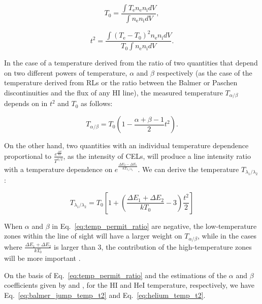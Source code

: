 \documentclass[fleqn,usenatbib]{mnras}
\begin{document}
\begin{equation}
    \label{eq:T0_def}
    T_{\mathrm 0}=\frac{\int T_{\mathrm e} n_{\mathrm e} n_{\mathrm i} dV}{\int n_{\mathrm e} n_{\mathrm i} dV},
\end{equation}

\begin{equation}
    \label{eq:t2_def}
    t^2=\frac{\int\left(T_{\mathrm e}-T_{\mathrm 0} \right)^2 n_{\mathrm e} n_{\mathrm i} dV}{T_{\mathrm 0} \int n_{\mathrm e} n_{\mathrm i} dV}.
\end{equation}

In the case of a temperature derived from the ratio of two quantities that depend on two different powers of temperature, $\alpha$ and $\beta$ respectively (as the case of the temperature derived from RLs or the ratio between the Balmer or Paschen discontinuities and the flux of any \mbox{H}\thinspace \mbox{I} line), the measured temperature $T_{\alpha/\beta}$ depends on in $t^2$ and $T_0$ as follows:  

\begin{equation}
    \label{eq:temp_permit_ratio}
    T_{\alpha/\beta}=T_0\left(1-\frac{\alpha+\beta-1}{2} t^2\right).
\end{equation}{}

On the other hand, two quantities with an individual temperature dependence proportional to $\frac{e^{\frac{\Delta E}{kT}}}{T^{1/2}}$, as the intensity of CELs, will produce a line intensity ratio with a temperature dependence on $e^{\frac{\Delta E_2-\Delta E_1}{k T_{\lambda_1/\lambda_2}}}$. We can derive the temperature $T_{\lambda_1/\lambda_2}$: 

\begin{equation}
    \label{eq:temp_forbidden_ratio}
    T_{\lambda_1/\lambda_2}=T_0 \left[1+\left(\frac{\Delta E_1 +\Delta E_2}{k T_0}-3\right)\frac{t^2}{2} \right]
\end{equation}{}

When $\alpha$ and $\beta$ in Eq.~\eqref{eq:temp_permit_ratio} are negative, the low-temperature zones within the line of sight will have a larger weight on $T_{\alpha/\beta}$, while in the cases where $\frac{\Delta E_1 +\Delta E_2}{kT_0}$ is larger than 3, the contribution of the high-temperature zones will be more important \citep{Peimbert67}.

On the basis of Eq.~\eqref{eq:temp_permit_ratio} and the estimations of the  $\alpha$ and $\beta$ coefficients given by \citet{Peimbert69} and \citet{Zhang05}, for the \mbox{H}\thinspace \mbox{I} and \mbox{He}\thinspace \mbox{I} temperature, respectively, we have Eq.~\eqref{eq:balmer_jump_temp_t2} and Eq.~\eqref{eq:helium_temp_t2}.
\end{document}
